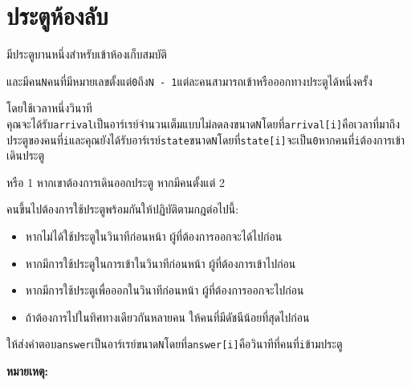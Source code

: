 \documentclass{article}
\begin{document}
\section*{ประตูห้องลับ}

มีประตูบานหนึ่งสำหรับเข้าห้องเก็บสมบัติ

และมีคน\texttt{N}คนที่มีหมายเลขตั้งแต่\texttt{0}ถึง\texttt{N\ -\ 1}แต่ละคนสามารถเข้าหรือออกทางประตูได้หนึ่งครั้ง

โดยใช้เวลาหนึ่งวินาที\\



คุณจะได้รับ\texttt{arrival}เป็นอาร์เรย์จำนวนเต็มแบบไม่ลดลงขนาด\texttt{N}โดยที่\texttt{arrival{[}i{]}}คือเวลาที่มาถึงประตูของคนที่\texttt{i}และคุณยังได้รับอาร์เรย์\texttt{state}ขนาด\texttt{N}โดยที่\texttt{state{[}i{]}}จะเป็น\texttt{0}หากคนที่\texttt{i}ต้องการเข้าเดินประตู

หรือ 1 หากเขาต้องการเดินออกประตู หากมีคนตั้งแต่ 2

คนขึ้นไปต้องการใช้ประตูพร้อมกันให้ปฏิบัติตามกฎต่อไปนี้:\\



\begin{itemize}

\item

  หากไม่ได้ใช้ประตูในวินาทีก่อนหน้า ผู้ที่ต้องการออกจะได้ไปก่อน

\item

  หากมีการใช้ประตูในการเข้าในวินาทีก่อนหน้า ผู้ที่ต้องการเข้าไปก่อน

\item

  หากมีการใช้ประตูเพื่อออกในวินาทีก่อนหน้า ผู้ที่ต้องการออกจะไปก่อน

\item

  ถ้าต้องการไปในทิศทางเดียวกันหลายคน ให้คนที่มีดัชนีน้อยที่สุดไปก่อน

\end{itemize}



ให้ส่งคำตอบ\texttt{answer}เป็นอาร์เรย์ขนาด\texttt{N}โดยที่\texttt{answer{[}i{]}}คือวินาทีที่คนที่\texttt{i}ข้ามประตู



\hfill\break



\textbf{หมายเหตุ:}
\end{document}
